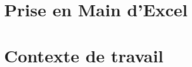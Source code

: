 \documentclass[a4paper, 12pt, twoside,openright]{report}
\begin{document}
	\let\cleardoublepage\clearpage
	\pagedegarde	
	\clearpage
		\setcounter{tocdepth}{1}	%
		\dominitoc						%
		\tableofcontents
		\listoffigures
		\listoftables
		\clearpage
	\setcounter{mtc}{3}	%
	\part{Prise en Main d'Excel}
	
	
	
	
	\clearpage
 	\part{Contexte de travail}
	\clearpage
	\nopagebreak
 	
 	
\end{document}
